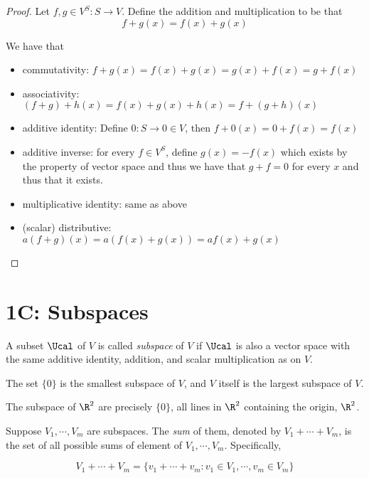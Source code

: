\documentclass{extarticle}
\begin{document}
\begin{proof}
Let \(f, g \in V^S \colon S \to V\). Define the addition and multiplication to be that 
\[f + g (x) = f(x) + g(x)\]

We have that 
\begin{itemize}
    \item commutativity: \(f + g(x) = f(x) + g(x) = g(x) + f(x) = g+f (x)\)
    \item associativity: \((f + g)+h (x) = f(x) + g(x) + h(x) = f + (g + h)(x)\)
    \item additive identity: Define \(0\colon S \to 0 \in V\), then \(f+0(x) = 0 + f(x) = f(x)\)
    \item additive inverse: for every \(f \in V^S\), define \(g(x) = -f(x)\) which exists
    by the property of vector space and thus we have that \(g + f = 0\) for every \(x\)
    and thus that it exists. 
    \item multiplicative identity: same as above 
    \item (scalar) distributive: \(a(f+g)(x) = a(f(x) + g(x)) = af(x)+g(x)\)
\end{itemize}
\end{proof}

\newpage 
\section*{1C: Subspaces}

\begin{definition}[subspace]
    A subset \(\Ucal\) of \(V\) is called \emph{subspace} of \(V\) if \(\Ucal\)
    is also a vector space with the same additive identity, addition, and 
    scalar multiplication as on \(V\). 
\end{definition}

\begin{remark}
    The set \(\{0\}\) is the smallest subspace of \(V\), and \(V\) itself 
    is the largest subspace of \(V\). 
\end{remark}

\begin{remark}
    The subspace of \(\R^2\) are precisely \(\{0\}\), all lines in \(\R^2\)
    containing the origin, \(\R^2\). 
\end{remark}

\begin{definition} 
    Suppose \(V_1, \cdots, V_m\) are subspaces. The \emph{sum} of them, denoted
    by \(V_1 + \cdots + V_m\), is the set of all possible sums of element 
    of \(V_1, \cdots, V_m\). Specifically,

    \[V_1 + \cdots + V_m = \{v_1 + \cdots + v_m \colon v_1 \in V_1, \cdots, v_m \in V_m\}\]
\end{definition}
\end{document}
